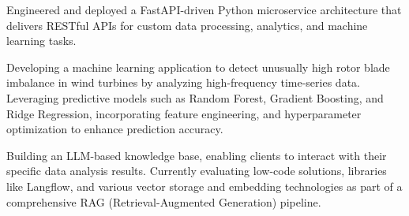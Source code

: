 \begin{tightemize}
    \item Engineered and deployed a FastAPI-driven Python microservice architecture that delivers RESTful APIs for custom data processing, analytics, and machine learning tasks.

    \item Developing a machine learning application to detect unusually high rotor blade imbalance in wind turbines by analyzing high-frequency time-series data. Leveraging predictive models such as Random Forest, Gradient Boosting, and Ridge Regression, incorporating feature engineering, and hyperparameter optimization to enhance prediction accuracy.

    \item Building an LLM-based knowledge base, enabling clients to interact with their specific data analysis results. Currently evaluating low-code solutions, libraries like Langflow, and various vector storage and embedding technologies as part of a comprehensive RAG (Retrieval-Augmented Generation) pipeline.

\end{tightemize}